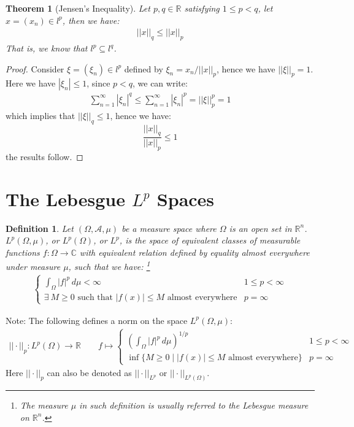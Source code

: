 \documentclass[11pt]{book}
\theoremstyle{break}
\theoremstyle{break}
\newtheorem{thm}{Theorem}[section]
\newtheorem{defn}{Definition}[corL]
\newcommand{\R}{\mathbb{R}}
\newcommand{\C}{\mathbb{C}}
\newcommand{\note}{\color{red}Note: \color{black}}
\begin{document}
\begin{thm}[Jensen's Inequality]
Let $p,q\in \R$ satisfying $1 \leq p < q$, let $x= (x_n) \in l^p$, then we have:
\begin{align*}
||x||_q \leq ||x||_p
\end{align*}
That is, we know that $l^p \subseteq l^q$.
\end{thm}
\begin{proof}
Consider $\xi = (\xi_n) \in l^p$ defined by $\xi_n = x_n / ||x||_p$, hence we have $||\xi||_p = 1$. Here we have $|\xi_n|\leq 1$, since $p<q$, we can write:
\begin{align*}
\sum_{n=1}^\infty |\xi_n|^q \leq \sum_{n=1}^\infty |\xi_n|^p = ||\xi||_p^p = 1
\end{align*}
which implies that $||\xi||_q \leq 1$, hence we have: 
$$\frac{ ||x||_q}{||x||_p} \leq 1$$
the results follow. 
\end{proof}



\newpage
\section[The Lebesgue $L^p$ Spaces]{\color{red}The Lebesgue $L^p$ Spaces\color{black}}
\begin{defn}
Let $(\Omega, \mathcal{A}, \mu)$ be a measure space where $\Omega$ is an open set in $\R^n$. $L^p(\Omega, \mu)$, or $L^p(\Omega)$, or $L^p$, is the space of equivalent classes of measurable functions $f:\Omega \to \C$ with equivalent relation defined by equality almost everywhere under measure $\mu$, such that we have: \footnote{The measure $\mu$ in such definition is usually referred to the Lebesgue measure on $\R^n$.}
\begin{align*}
\begin{cases}
\int_{\Omega} |f|^p \, d\mu < \infty & 1 \leq p < \infty\\
\exists\ M \geq 0 \text{ such that }|f(x)|\leq M \text{ almost everywhere} & p = \infty 
\end{cases}
\end{align*}
\end{defn}

\note The following defines a norm on the space $L^p(\Omega, \mu)$:
\begin{align*}
||\cdot ||_p: L^p(\Omega) \to \R \qquad f\mapsto \begin{cases}
\left(\int_{\Omega} |f|^p \, d\mu \right)^{1/p} & 1 \leq p < \infty\\
\inf\{ M \geq 0 \mid |f(x)| \leq M \text{ almost everywhere}\} & p=\infty
\end{cases}
\end{align*}
Here $||\cdot ||_p$ can also be denoted as $||\cdot ||_{L^p}$ or $||\cdot ||_{L^p(\Omega)}$.
\end{document}
